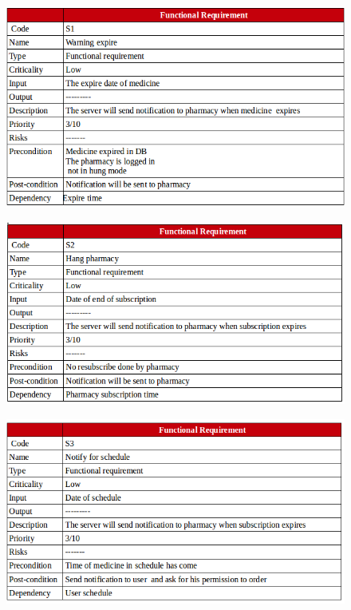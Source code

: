 \documentclass[]{article}
\begin{document}
\begin{figure}[H]
\centering
\includegraphics[scale=0.4]{./f/30}
\end{figure}

\begin{figure}[H]
\centering
\includegraphics[scale=0.4]{./f/31}
\end{figure}

\begin{figure}[H]
\centering
\includegraphics[scale=0.4]{./f/32}
\end{figure}
\end{document}
